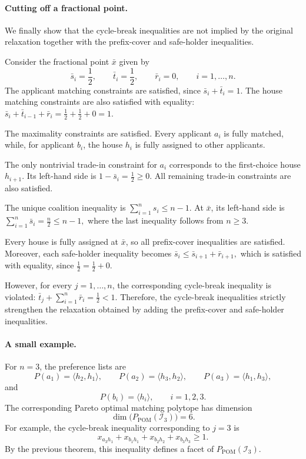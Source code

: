 \documentclass[12pt]{report}
\numberwithin{algorithm}{chapter}
\begin{document}
	\paragraph{Cutting off a fractional point.}
	We finally show that the cycle-break inequalities are not implied by the original relaxation together with the prefix-cover and safe-holder inequalities.
	
	Consider the fractional point $\bar{x}$ given by
	\begin{equation}\label{eq:cyclic-fractional-point}
		\bar{s}_i=\frac{1}{2},
		\qquad
		\bar{t}_i=\frac{1}{2},
		\qquad
		\bar{r}_i=0,
		\qquad i=1,\ldots,n.
	\end{equation}
	The applicant matching constraints are satisfied, since $\bar{s}_i+\bar{t}_i=1.$ The house matching constraints are also satisfied with equality: $\bar{s}_i+\bar{t}_{i-1}+\bar{r}_i = \frac{1}{2}+\frac{1}{2}+0 = 1.$
	
	The maximality constraints are satisfied. Every applicant $a_i$ is fully matched, while, for applicant $b_i$, the house $h_i$ is fully assigned to other applicants.
	
	The only nontrivial trade-in constraint for $a_i$ corresponds to the first-choice house $h_{i+1}$. Its left-hand side is $1-\bar{s}_i = \frac{1}{2} \ge 0.$ All remaining trade-in constraints are also satisfied.
	
	The unique coalition inequality is $\sum_{i=1}^{n}s_i\le n-1.$ At $\bar{x}$, its left-hand side is $\sum_{i=1}^{n}\bar{s}_i = \frac{n}{2} \le n-1,$ where the last inequality follows from $n\ge 3$.
	
	Every house is fully assigned at $\bar{x}$, so all prefix-cover inequalities are satisfied. Moreover, each safe-holder inequality becomes $\bar{s}_i \le \bar{s}_{i+1}+\bar{r}_{i+1},$ which is satisfied with equality, since $\frac{1}{2} = \frac{1}{2}+0.$
	
	However, for every $j=1,\ldots,n$, the corresponding cycle-break inequality is violated: $\bar{t}_j+\sum_{i=1}^{n}\bar{r}_i = \frac{1}{2} < 1.$ Therefore, the cycle-break inequalities strictly strengthen the relaxation obtained by adding the prefix-cover and safe-holder inequalities.
	
	\paragraph{A small example.}
	For $n=3$, the preference lists are
	\[
	P(a_1)=\langle h_2,h_1\rangle,
	\qquad
	P(a_2)=\langle h_3,h_2\rangle,
	\qquad
	P(a_3)=\langle h_1,h_3\rangle,
	\]
	and
	\[
	P(b_i)=\langle h_i\rangle,
	\qquad i=1,2,3.
	\]
	The corresponding Pareto optimal matching polytope has dimension
	\[
	\dim\bigl(P_{\mathrm{POM}}(\mathcal{I}_3)\bigr)=6.
	\]
	For example, the cycle-break inequality corresponding to $j=3$ is
	\[
	x_{a_3h_1}
	+
	x_{b_1h_1}
	+
	x_{b_2h_2}
	+
	x_{b_3h_3}
	\ge 1.
	\]
	By the previous theorem, this inequality defines a facet of
	$P_{\mathrm{POM}}(\mathcal{I}_3)$.
	
\end{document}
